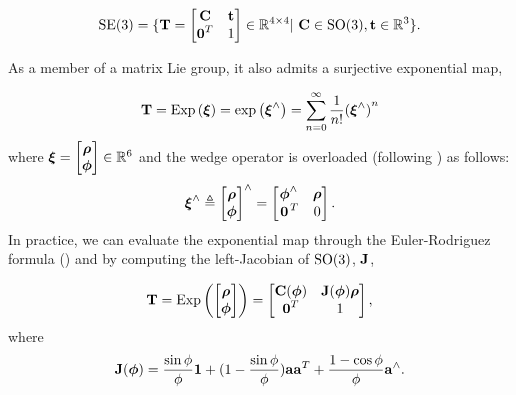 \begin{equation}
\mathrm{SE}(3) = \{ \boldsymbol{\mathbf{T}} = \begin{bmatrix} \boldsymbol{\mathbf{C}} & \boldsymbol{\mathbf{t}} \\ \boldsymbol{\mathbf{0}}^T & 1 \end{bmatrix} \in \mathbb{R}{}^{4 \times 4} | ~  \boldsymbol{\mathbf{C}} \in \mathrm{SO}(3),  \boldsymbol{\mathbf{t}} \in \mathbb{R}{}^3  \}.
\end{equation}

As a member of a matrix Lie group, it also admits a surjective exponential map,

\begin{equation}
\boldsymbol{\mathbf{T}} = \mathrm{Exp}\left({\boldsymbol{\mathbf{\xi}}}\right) = \mathrm{exp}\left({\boldsymbol{\mathbf{\xi}}}^{\wedge}\right) = \sum_{n=0}^{\infty}  \frac{1}{n!} {(\boldsymbol{\mathbf{\xi}}^\wedge)}^n	
\end{equation}
where $\boldsymbol{\mathbf{\xi}} = \begin{bmatrix} \boldsymbol{\mathbf{\rho}} \\ \boldsymbol{\mathbf{\phi}} \end{bmatrix} \in \mathbb{R}{}^6$ and the wedge operator is overloaded (following \cite{Barfoot2017-ri}) as follows:
\begin{equation}
  \boldsymbol{\mathbf{\xi}}^\wedge \triangleq \begin{bmatrix} \boldsymbol{\mathbf{\rho}} \\ \boldsymbol{\mathbf{\phi}} \end{bmatrix} ^\wedge = \begin{bmatrix}
  \boldsymbol{\mathbf{\phi}}^\wedge & \boldsymbol{\mathbf{\rho}} \\ \left.{\boldsymbol{\mathbf{0}}}\right.^T &  0 \end{bmatrix}.	
\end{equation}
In practice, we can evaluate the exponential map through the Euler-Rodriguez formula () and by computing the left-Jacobian of $\mathrm{SO}(3)$,  $\boldsymbol{\mathbf{J}}$, 

\begin{equation}
\boldsymbol{\mathbf{T}} = \mathrm{Exp}\left({\begin{bmatrix} \boldsymbol{\mathbf{\rho}} \\ \boldsymbol{\mathbf{\phi}} \end{bmatrix}}\right) = \begin{bmatrix} \boldsymbol{\mathbf{C}}(\boldsymbol{\mathbf{\phi}}) & \boldsymbol{\mathbf{J}}(\boldsymbol{\mathbf{\phi}}) \boldsymbol{\mathbf{\rho}} \\ \boldsymbol{\mathbf{0}}^T & 1 \end{bmatrix},
\end{equation}
where
\begin{equation}
\boldsymbol{\mathbf{J}}(\boldsymbol{\mathbf{\phi}}) = \frac{\sin{\phi}}{\phi} \boldsymbol{\mathbf{1}} + (1 - \frac{\sin{\phi}}{\phi}) \boldsymbol{\mathbf{a}}\boldsymbol{\mathbf{a}}^T + \frac{1 - \cos{\phi}}{\phi} \boldsymbol{\mathbf{a}}^\wedge.
\end{equation}




